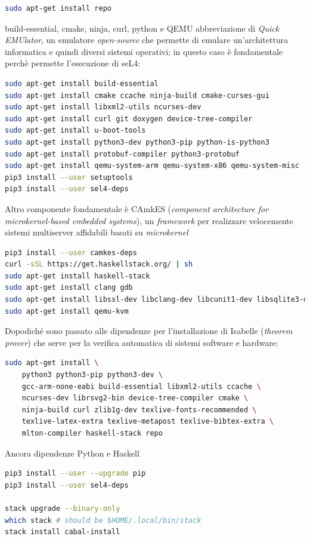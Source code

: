 \lstset{style=mystyle}

\begin{lstlisting}[language=bash]
sudo apt-get install repo
\end{lstlisting}

build-essential, cmake, ninja, curl, python e QEMU abbreviazione di \textit{Quick EMUlator}, un emulatore \textit{open-source} che permette di emulare un'architettura informatica e quindi diversi sistemi operativi; in questo caso è fondamentale perchè permette l'esecuzione di seL4:
\begin{lstlisting}[language=bash]
sudo apt-get install build-essential
sudo apt-get install cmake ccache ninja-build cmake-curses-gui
sudo apt-get install libxml2-utils ncurses-dev
sudo apt-get install curl git doxygen device-tree-compiler
sudo apt-get install u-boot-tools
sudo apt-get install python3-dev python3-pip python-is-python3
sudo apt-get install protobuf-compiler python3-protobuf
sudo apt-get install qemu-system-arm qemu-system-x86 qemu-system-misc
pip3 install --user setuptools
pip3 install --user sel4-deps
\end{lstlisting}

Altro componente fondamentale è CAmkES (\textit{component architecture for \textit{microkernel}-based embedded systems}), un \textit{framework} per realizzare velocemente sistemi multiserver affidabili basati su \textit{microkernel}
\begin{lstlisting}[language=bash]
pip3 install --user camkes-deps
curl -sSL https://get.haskellstack.org/ | sh
sudo apt-get install haskell-stack
sudo apt-get install clang gdb
sudo apt-get install libssl-dev libclang-dev libcunit1-dev libsqlite3-dev
sudo apt-get install qemu-kvm
\end{lstlisting}

Dopodiché sono passato alle dipendenze per l'installazione di Isabelle (\textit{theorem prover}) che serve per la verifica automatica di sistemi software e hardware:
\begin{lstlisting}[language=bash]
sudo apt-get install \
    python3 python3-pip python3-dev \
    gcc-arm-none-eabi build-essential libxml2-utils ccache \
    ncurses-dev librsvg2-bin device-tree-compiler cmake \
    ninja-build curl zlib1g-dev texlive-fonts-recommended \
    texlive-latex-extra texlive-metapost texlive-bibtex-extra \
    mlton-compiler haskell-stack repo
\end{lstlisting}

Ancora dipendenze Python e Haskell
\begin{lstlisting}[language=bash]
pip3 install --user --upgrade pip
pip3 install --user sel4-deps

stack upgrade --binary-only
which stack # should be $HOME/.local/bin/stack
stack install cabal-install
\end{lstlisting}

